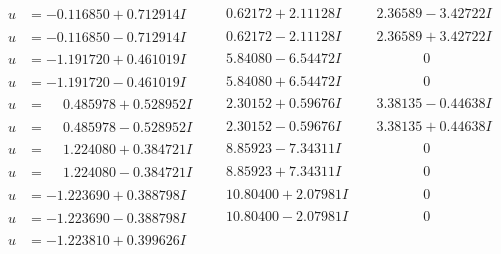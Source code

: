 \documentclass[1p]{elsarticle_modified}
\theoremstyle{definition}
\begin{document}
$$\begin{array}{c|c|c}
 \hline 
\begin{aligned}
u &= -0.116850 + 0.712914 I\end{aligned}
 & \phantom{-}0.62172 + 2.11128 I & \phantom{-}2.36589 - 3.42722 I \\ \hline\begin{aligned}
u &= -0.116850 - 0.712914 I\end{aligned}
 & \phantom{-}0.62172 - 2.11128 I & \phantom{-}2.36589 + 3.42722 I \\ \hline\begin{aligned}
u &= -1.191720 + 0.461019 I\end{aligned}
 & \phantom{-}5.84080 - 6.54472 I & \phantom{-0.000000 } 0 \\ \hline\begin{aligned}
u &= -1.191720 - 0.461019 I\end{aligned}
 & \phantom{-}5.84080 + 6.54472 I & \phantom{-0.000000 } 0 \\ \hline\begin{aligned}
u &= \phantom{-}0.485978 + 0.528952 I\end{aligned}
 & \phantom{-}2.30152 + 0.59676 I & \phantom{-}3.38135 - 0.44638 I \\ \hline\begin{aligned}
u &= \phantom{-}0.485978 - 0.528952 I\end{aligned}
 & \phantom{-}2.30152 - 0.59676 I & \phantom{-}3.38135 + 0.44638 I \\ \hline\begin{aligned}
u &= \phantom{-}1.224080 + 0.384721 I\end{aligned}
 & \phantom{-}8.85923 - 7.34311 I & \phantom{-0.000000 } 0 \\ \hline\begin{aligned}
u &= \phantom{-}1.224080 - 0.384721 I\end{aligned}
 & \phantom{-}8.85923 + 7.34311 I & \phantom{-0.000000 } 0 \\ \hline\begin{aligned}
u &= -1.223690 + 0.388798 I\end{aligned}
 & \phantom{-}10.80400 + 2.07981 I & \phantom{-0.000000 } 0 \\ \hline\begin{aligned}
u &= -1.223690 - 0.388798 I\end{aligned}
 & \phantom{-}10.80400 - 2.07981 I & \phantom{-0.000000 } 0 \\ \hline\begin{aligned}
u &= -1.223810 + 0.399626 I\end{aligned}

\end{array}$$
\end{document}
